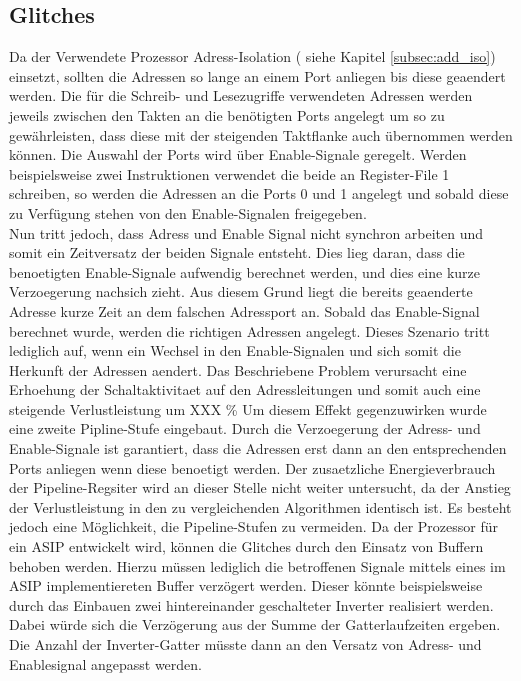 \subsection{Glitches}
Da der Verwendete Prozessor Adress-Isolation ( siehe Kapitel \ref{subsec:add_iso}) einsetzt, sollten die Adressen so lange an einem Port anliegen bis diese geaendert werden.
Die für die Schreib- und Lesezugriffe verwendeten Adressen werden jeweils zwischen den Takten an die benötigten Ports angelegt um so zu gewährleisten, dass diese mit der steigenden Taktflanke auch übernommen werden können. Die Auswahl der Ports wird über Enable-Signale geregelt. Werden beispielsweise zwei Instruktionen verwendet die beide an Register-File 1 schreiben, so werden die Adressen an die Ports 0 und 1 angelegt und sobald diese zu Verfügung stehen von den Enable-Signalen freigegeben.\\
Nun tritt jedoch, dass Adress und Enable Signal nicht synchron arbeiten und somit ein Zeitversatz der beiden Signale entsteht. Dies lieg daran, dass die benoetigten Enable-Signale aufwendig berechnet werden, und dies eine kurze Verzoegerung nachsich zieht. Aus diesem Grund liegt die bereits geaenderte Adresse kurze Zeit an dem falschen Adressport an. Sobald das Enable-Signal berechnet wurde, werden die richtigen Adressen angelegt. Dieses Szenario tritt lediglich auf, wenn ein Wechsel in den Enable-Signalen und sich somit die Herkunft der Adressen aendert. Das Beschriebene Problem verursacht eine Erhoehung der Schaltaktivitaet auf den Adressleitungen und somit auch eine steigende Verlustleistung um XXX \%
Um diesem Effekt gegenzuwirken wurde eine zweite Pipline-Stufe eingebaut. Durch die Verzoegerung der Adress- und Enable-Signale ist garantiert, dass die Adressen erst dann an den entsprechenden Ports anliegen wenn diese benoetigt werden. Der zusaetzliche Energieverbrauch der Pipeline-Regsiter wird an dieser Stelle nicht weiter untersucht, da der Anstieg der Verlustleistung in den zu vergleichenden Algorithmen identisch ist.
Es besteht jedoch eine Möglichkeit, die Pipeline-Stufen zu vermeiden.
Da der Prozessor für ein ASIP entwickelt wird, können die Glitches durch den Einsatz von Buffern behoben werden. Hierzu müssen lediglich die betroffenen Signale mittels eines im ASIP implementiereten Buffer verzögert werden. Dieser könnte beispielsweise durch das Einbauen zwei hintereinander geschalteter Inverter realisiert werden. Dabei würde sich die Verzögerung aus der Summe der Gatterlaufzeiten ergeben. Die Anzahl der Inverter-Gatter müsste dann an den Versatz von Adress- und Enablesignal angepasst werden. 

